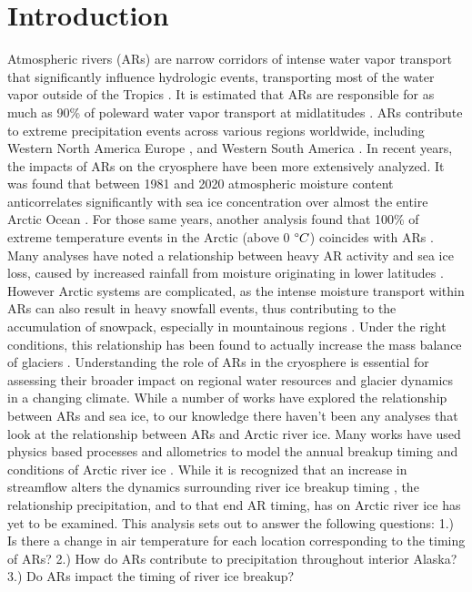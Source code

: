 \documentclass[draft]{AR_analysis_}
\begin{document}
\section{Introduction}

Atmospheric rivers (ARs) are narrow corridors of intense water vapor
transport that significantly influence hydrologic events, transporting
most of the water vapor outside of the Tropics \cite{NOAA_AR_summary}.
It is estimated that ARs are responsible for as much as 90\% of poleward
water vapor transport at midlatitudes \cite{other_alg}. ARs contribute to
extreme precipitation events across various regions worldwide, including
Western North America \cite{Dettinger2004, Neiman2008, Guan2010,
ARs_flood_WA_State, ARs_flood_Russian_River_CA, Ralph2013, ARs_CA}
Europe \cite{Lavers2013, ARs_impact_Norway}, and Western South America
\cite{ARs_impact_SA}. In recent years, the impacts of ARs on the
cryosphere have been more extensively analyzed. It was found that between
1981 and 2020 atmospheric moisture content anticorrelates significantly
with sea ice concentration over almost the entire Arctic Ocean
\cite{ARs_lead_to_sea_ice_loss}. For those same years, another analysis
found that 100\% of extreme temperature events in the Arctic (above 0
$\degree C$) coincides with ARs \cite{Ma2023}. Many analyses have noted
a relationship between heavy AR activity and sea ice loss, caused by
increased rainfall from moisture originating in lower latitudes
\cite{Zhang2023, maclennan_contribution_2022}. However Arctic systems
are complicated, as the intense moisture transport within ARs can also
result in heavy snowfall events, thus contributing to the accumulation
of snowpack, especially in mountainous regions \cite{Saavedra2020,
Guan2010}. Under the right conditions, this relationship has been found
to actually increase the mass balance of glaciers \cite{Little2019}.
Understanding the role of ARs in the cryosphere is essential for
assessing their broader impact on regional water resources and glacier
dynamics in a changing climate. While a number of works have explored
the relationship between ARs and sea ice, to our knowledge there haven't
been any analyses that look at the relationship between ARs and Arctic
river ice. Many works have used physics based processes and allometrics
to model the annual breakup timing and conditions of Arctic river ice
\cite{Paily, ashton1986river, Prowse_Bonsal_Duguay_Lacroix_2007,
jasek1998, shen_newest}. While it is recognized that an increase in
streamflow alters the dynamics surrounding river ice breakup timing
\cite{ashton1986river}, the relationship precipitation, and to that end
AR timing, has on Arctic river ice has yet to be examined. This analysis
sets out to answer the following questions: 1.) Is there a change in
air temperature for each location corresponding to the timing of ARs?
2.) How do ARs contribute to precipitation throughout interior Alaska?
3.) Do ARs impact the timing of river ice breakup?
\end{document}
